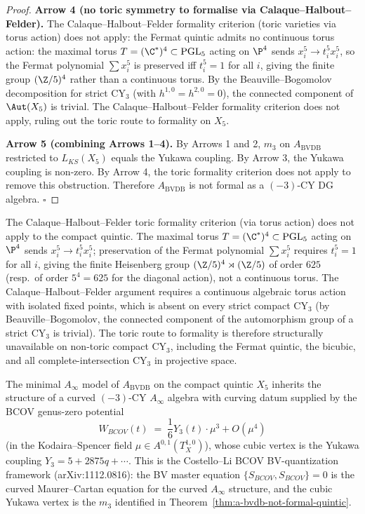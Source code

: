 \begin{proof}
\textbf{Arrow 4 (no toric symmetry to formalise via Calaque--Halbout--Felder).}
The Calaque--Halbout--Felder formality criterion (toric varieties
via torus action) does not apply: the Fermat quintic admits no
continuous torus action: the maximal torus $T = (\C^*)^4 \subset \mathrm{PGL}_5$
acting on $\P^4$ sends $x_i^5 \to t_i^5 x_i^5$, so the Fermat polynomial
$\sum x_i^5$ is preserved iff $t_i^5 = 1$ for all $i$, giving the finite
group $(\Z/5)^4$ rather than a continuous torus. By the Beauville--Bogomolov
decomposition for strict CY$_3$ (with $h^{1,0} = h^{2,0} = 0$), the
connected component of $\Aut(X_5)$ is trivial. The Calaque--Halbout--Felder
formality criterion does not apply, ruling out the toric route to
formality on $X_5$.

\textbf{Arrow 5 (combining Arrows 1--4).} By Arrows 1 and 2, $m_3$ on
$A_{\mathrm{BVDB}}$ restricted to $L_{KS}(X_5)$ equals the Yukawa
coupling. By Arrow 3, the Yukawa coupling is non-zero. By Arrow 4, the
toric formality criterion does not apply to remove this obstruction.
Therefore $A_{\mathrm{BVDB}}$ is not formal as a $(-3)$-CY DG algebra.
\hfill$\square$
\end{proof}

\begin{remark}
\label{rem:calaque-halbout-felder-fails-quintic}
The Calaque--Halbout--Felder toric formality criterion (via torus action)
does not apply to the compact quintic. The maximal torus
$T = (\C^*)^4 \subset \mathrm{PGL}_5$ acting on
$\P^4$ sends $x_i^5 \to t_i^5 x_i^5$; preservation of the Fermat
polynomial $\sum x_i^5$ requires $t_i^5 = 1$ for all $i$, giving the
finite Heisenberg group $(\Z/5)^4 \rtimes (\Z/5)$ of order $625$ (resp.\
of order $5^4 = 625$ for the diagonal action), not a continuous torus.
The Calaque--Halbout--Felder argument requires a continuous algebraic
torus action with isolated fixed points, which is absent on every
strict compact CY$_3$ (by Beauville--Bogomolov, the connected component
of the automorphism group of a strict CY$_3$ is trivial). The toric
route to formality is therefore structurally unavailable on
non-toric compact CY$_3$, including the Fermat quintic, the bicubic,
and all complete-intersection CY$_3$ in projective space.
\end{remark}

\begin{corollary}
\label{cor:yukawa-curving-bcov}
The minimal $A_\infty$ model of $A_{\mathrm{BVDB}}$ on the compact quintic
$X_5$ inherits the structure of a curved $(-3)$-CY $A_\infty$ algebra
with curving datum supplied by the BCOV genus-zero potential
\[
 W_{BCOV}(t) \;=\; \frac{1}{6} Y_3(t) \cdot \mu^3 + O(\mu^4)
\]
(in the Kodaira--Spencer field $\mu \in A^{0,1}(T^{1,0}_X)$), whose
cubic vertex is the Yukawa coupling $Y_3 = 5 + 2875 q + \cdots$.
This is the Costello--Li BCOV BV-quantization framework
(arXiv:1112.0816): the BV master equation $\{S_{BCOV}, S_{BCOV}\} = 0$
is the curved Maurer--Cartan equation for the curved $A_\infty$
structure, and the cubic Yukawa vertex is the $m_3$ identified in
Theorem~\ref{thm:a-bvdb-not-formal-quintic}.
\end{corollary}

